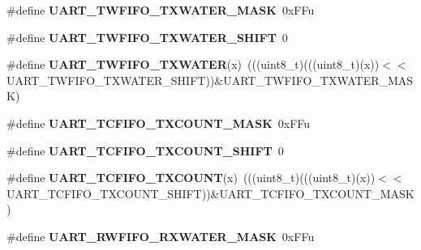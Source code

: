 \begin{DoxyCompactItemize}
\item 
\#define {\bfseries U\+A\+R\+T\+\_\+\+T\+W\+F\+I\+F\+O\+\_\+\+T\+X\+W\+A\+T\+E\+R\+\_\+\+M\+A\+SK}~0x\+F\+Fu\hypertarget{group__UART__Register__Masks_ga4d1d724beef4708553a5066491ebf32e}{}\label{group__UART__Register__Masks_ga4d1d724beef4708553a5066491ebf32e}

\item 
\#define {\bfseries U\+A\+R\+T\+\_\+\+T\+W\+F\+I\+F\+O\+\_\+\+T\+X\+W\+A\+T\+E\+R\+\_\+\+S\+H\+I\+FT}~0\hypertarget{group__UART__Register__Masks_ga55b227e0cf4669aec87ec3fb3bb494c8}{}\label{group__UART__Register__Masks_ga55b227e0cf4669aec87ec3fb3bb494c8}

\item 
\#define {\bfseries U\+A\+R\+T\+\_\+\+T\+W\+F\+I\+F\+O\+\_\+\+T\+X\+W\+A\+T\+ER}(x)~(((uint8\+\_\+t)(((uint8\+\_\+t)(x))$<$$<$U\+A\+R\+T\+\_\+\+T\+W\+F\+I\+F\+O\+\_\+\+T\+X\+W\+A\+T\+E\+R\+\_\+\+S\+H\+I\+FT))\&U\+A\+R\+T\+\_\+\+T\+W\+F\+I\+F\+O\+\_\+\+T\+X\+W\+A\+T\+E\+R\+\_\+\+M\+A\+SK)\hypertarget{group__UART__Register__Masks_gaefe25e2834c190a10976bb2a2c0708db}{}\label{group__UART__Register__Masks_gaefe25e2834c190a10976bb2a2c0708db}

\item 
\#define {\bfseries U\+A\+R\+T\+\_\+\+T\+C\+F\+I\+F\+O\+\_\+\+T\+X\+C\+O\+U\+N\+T\+\_\+\+M\+A\+SK}~0x\+F\+Fu\hypertarget{group__UART__Register__Masks_gab3c6a27ca034de86ac2aa4f5c55781f2}{}\label{group__UART__Register__Masks_gab3c6a27ca034de86ac2aa4f5c55781f2}

\item 
\#define {\bfseries U\+A\+R\+T\+\_\+\+T\+C\+F\+I\+F\+O\+\_\+\+T\+X\+C\+O\+U\+N\+T\+\_\+\+S\+H\+I\+FT}~0\hypertarget{group__UART__Register__Masks_gaae504c1c6564913b0daeaf835defa8aa}{}\label{group__UART__Register__Masks_gaae504c1c6564913b0daeaf835defa8aa}

\item 
\#define {\bfseries U\+A\+R\+T\+\_\+\+T\+C\+F\+I\+F\+O\+\_\+\+T\+X\+C\+O\+U\+NT}(x)~(((uint8\+\_\+t)(((uint8\+\_\+t)(x))$<$$<$U\+A\+R\+T\+\_\+\+T\+C\+F\+I\+F\+O\+\_\+\+T\+X\+C\+O\+U\+N\+T\+\_\+\+S\+H\+I\+FT))\&U\+A\+R\+T\+\_\+\+T\+C\+F\+I\+F\+O\+\_\+\+T\+X\+C\+O\+U\+N\+T\+\_\+\+M\+A\+SK)\hypertarget{group__UART__Register__Masks_gad083a41f9d63f7351e3b8e7507ad42f5}{}\label{group__UART__Register__Masks_gad083a41f9d63f7351e3b8e7507ad42f5}

\item 
\#define {\bfseries U\+A\+R\+T\+\_\+\+R\+W\+F\+I\+F\+O\+\_\+\+R\+X\+W\+A\+T\+E\+R\+\_\+\+M\+A\+SK}~0x\+F\+Fu\hypertarget{group__UART__Register__Masks_ga94cd69bba6b852fbd438b8b4b1ab1372}{}\label{group__UART__Register__Masks_ga94cd69bba6b852fbd438b8b4b1ab1372}


\end{DoxyCompactItemize}
